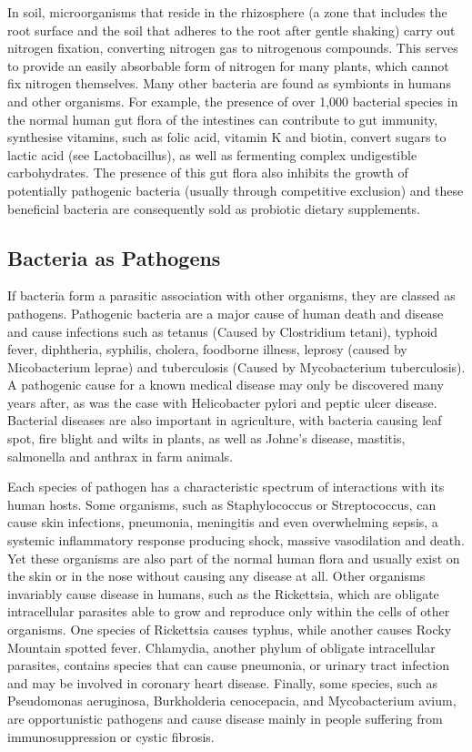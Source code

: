 In soil, microorganisms that reside in the rhizosphere (a zone that includes the root surface and the soil that adheres to the root after gentle shaking) carry out nitrogen fixation, converting nitrogen gas to nitrogenous compounds. This serves to provide an easily absorbable form of nitrogen for many plants, which cannot fix nitrogen themselves. Many other bacteria are found as symbionts in humans and other organisms. For example, the presence of over 1,000 bacterial species in the normal human gut flora of the intestines can contribute to gut immunity, synthesise vitamins, such as folic acid, vitamin K and biotin, convert sugars to lactic acid (see Lactobacillus), as well as fermenting complex undigestible carbohydrates. The presence of this gut flora also inhibits the growth of potentially pathogenic bacteria (usually through competitive exclusion) and these beneficial bacteria are consequently sold as probiotic dietary supplements.

\hypertarget{bacteria-as-pathogens}{%
\subsection{Bacteria as Pathogens}\label{bacteria-as-pathogens}}

If bacteria form a parasitic association with other organisms, they are classed as pathogens. Pathogenic bacteria are a major cause of human death and disease and cause infections such as tetanus (Caused by Clostridium tetani), typhoid fever, diphtheria, syphilis, cholera, foodborne illness, leprosy (caused by Micobacterium leprae) and tuberculosis (Caused by Mycobacterium tuberculosis). A pathogenic cause for a known medical disease may only be discovered many years after, as was the case with Helicobacter pylori and peptic ulcer disease. Bacterial diseases are also important in agriculture, with bacteria causing leaf spot, fire blight and wilts in plants, as well as Johne's disease, mastitis, salmonella and anthrax in farm animals.

Each species of pathogen has a characteristic spectrum of interactions with its human hosts. Some organisms, such as Staphylococcus or Streptococcus, can cause skin infections, pneumonia, meningitis and even overwhelming sepsis, a systemic inflammatory response producing shock, massive vasodilation and death. Yet these organisms are also part of the normal human flora and usually exist on the skin or in the nose without causing any disease at all. Other organisms invariably cause disease in humans, such as the Rickettsia, which are obligate intracellular parasites able to grow and reproduce only within the cells of other organisms. One species of Rickettsia causes typhus, while another causes Rocky Mountain spotted fever. Chlamydia, another phylum of obligate intracellular parasites, contains species that can cause pneumonia, or urinary tract infection and may be involved in coronary heart disease. Finally, some species, such as Pseudomonas aeruginosa, Burkholderia cenocepacia, and Mycobacterium avium, are opportunistic pathogens and cause disease mainly in people suffering from immunosuppression or cystic fibrosis.

